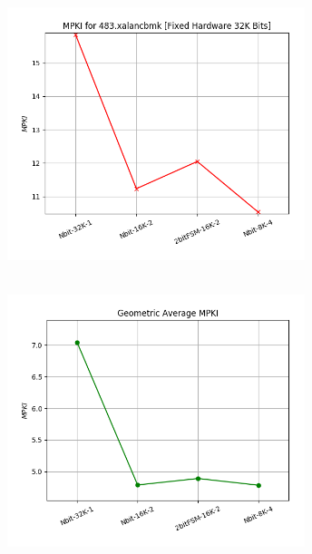    \begin{minipage}{\textwidth}
      \begin{center}
         \\
         \vspace{3mm}
         \includegraphics[width=0.65\textwidth, frame]{./graphs/4-2ii/483-xalancbmk.png}
         \vspace{6mm}
      \end{center}
   \end{minipage}

   \begin{minipage}{\textwidth}
      \begin{center}
         \\
         \vspace{3mm}
         \includegraphics[width=0.65\textwidth, frame]{./graphs/4-2ii/mean.png}
         \vspace{6mm}
      \end{center}
   \end{minipage}

